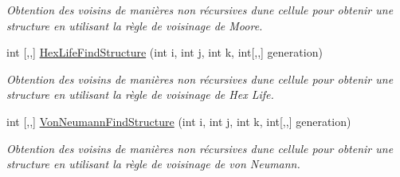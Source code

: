 \begin{DoxyCompactItemize}
\begin{DoxyCompactList}\small\item\em Obtention des voisins de manières non récursives d\textquotesingle{}une cellule pour obtenir une structure en utilisant la règle de voisinage de Moore. \end{DoxyCompactList}\item 
int \mbox{[},,\mbox{]} \mbox{\hyperlink{class_detection_a5fa3f90802c6cc9eb57c9ca7bcf417b8}{Hex\+Life\+Find\+Structure}} (int i, int j, int k, int\mbox{[},,\mbox{]} generation)
\begin{DoxyCompactList}\small\item\em Obtention des voisins de manières non récursives d\textquotesingle{}une cellule pour obtenir une structure en utilisant la règle de voisinage de Hex Life. \end{DoxyCompactList}\item 
int \mbox{[},,\mbox{]} \mbox{\hyperlink{class_detection_a1909fbb1d96dbc6fed37fabc89444945}{Von\+Neumann\+Find\+Structure}} (int i, int j, int k, int\mbox{[},,\mbox{]} generation)
\begin{DoxyCompactList}\small\item\em Obtention des voisins de manières non récursives d\textquotesingle{}une cellule pour obtenir une structure en utilisant la règle de voisinage de von Neumann. \end{DoxyCompactList}\end{DoxyCompactItemize}
